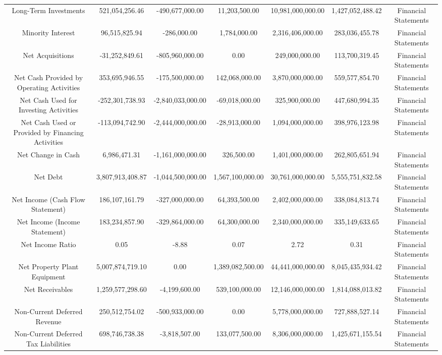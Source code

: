 \begin{longtable}{ccccccc}
Long-Term Investments & 521,054,256.46 & -490,677,000.00 & 11,203,500.00 & 10,981,000,000.00 & 1,427,052,488.42 & Financial Statements \\
Minority Interest & 96,515,825.94 & -286,000.00 & 1,784,000.00 & 2,316,406,000.00 & 283,036,455.78 & Financial Statements \\
Net Acquisitions & -31,252,849.61 & -805,960,000.00 & 0.00 & 249,000,000.00 & 113,700,319.45 & Financial Statements \\
Net Cash Provided by Operating Activities & 353,695,946.55 & -175,500,000.00 & 142,068,000.00 & 3,870,000,000.00 & 559,577,854.70 & Financial Statements \\
Net Cash Used for Investing Activities & -252,301,738.93 & -2,840,033,000.00 & -69,018,000.00 & 325,900,000.00 & 447,680,994.35 & Financial Statements \\
Net Cash Used or Provided by Financing Activities & -113,094,742.90 & -2,444,000,000.00 & -28,913,000.00 & 1,094,000,000.00 & 398,976,123.98 & Financial Statements \\
Net Change in Cash & 6,986,471.31 & -1,161,000,000.00 & 326,500.00 & 1,401,000,000.00 & 262,805,651.94 & Financial Statements \\
Net Debt & 3,807,913,408.87 & -1,044,500,000.00 & 1,567,100,000.00 & 30,761,000,000.00 & 5,555,751,832.58 & Financial Statements \\
Net Income (Cash Flow Statement) & 186,107,161.79 & -327,000,000.00 & 64,393,500.00 & 2,402,000,000.00 & 338,084,813.74 & Financial Statements \\
Net Income (Income Statement) & 183,234,857.90 & -329,864,000.00 & 64,300,000.00 & 2,340,000,000.00 & 335,149,633.65 & Financial Statements \\
Net Income Ratio & 0.05 & -8.88 & 0.07 & 2.72 & 0.31 & Financial Statements \\
Net Property Plant Equipment & 5,007,874,719.10 & 0.00 & 1,389,082,500.00 & 44,441,000,000.00 & 8,045,435,934.42 & Financial Statements \\
Net Receivables & 1,259,577,298.60 & -4,199,600.00 & 539,100,000.00 & 12,146,000,000.00 & 1,814,088,013.82 & Financial Statements \\
Non-Current Deferred Revenue & 250,512,754.02 & -500,933,000.00 & 0.00 & 5,778,000,000.00 & 727,888,527.14 & Financial Statements \\
Non-Current Deferred Tax Liabilities & 698,746,738.38 & -3,818,507.00 & 133,077,500.00 & 8,306,000,000.00 & 1,425,671,155.54 & Financial Statements \\

\end{longtable}
